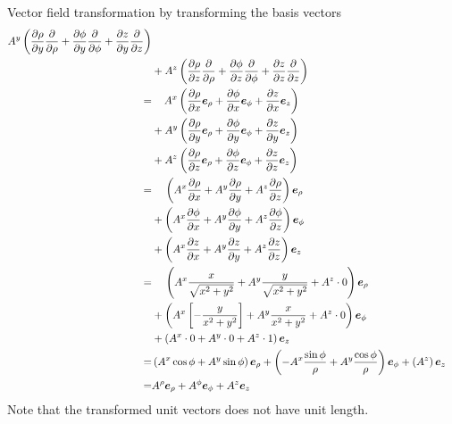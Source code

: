 \documentclass[a4paper, 12pt]{article}
\begin{document}
\begin{example}{Vector field transformation by transforming the basis vectors}
\begin{align*}
        A^y\left(
            \frac{\partial {\rho}}{\partial{y}}\frac{\partial {}}{\partial{\rho}} +
            \frac{\partial {\phi}}{\partial{y}}\frac{\partial {}}{\partial{\phi}} +
            \frac{\partial {z}}{\partial{y}}\frac{\partial {}}{\partial{z}}
           \right)\\
      &+
        A^z\left(
            \frac{\partial {\rho}}{\partial{z}}\frac{\partial {}}{\partial{\rho}} +
            \frac{\partial {\phi}}{\partial{z}}\frac{\partial {}}{\partial{\phi}} +
            \frac{\partial {z}}{\partial{z}}\frac{\partial {}}{\partial{z}}
           \right)\\
     =& \quad\, A^x\left(
            \frac{\partial {\rho}}{\partial{x}}\boldsymbol{e}_{\rho} +
            \frac{\partial {\phi}}{\partial{x}}\boldsymbol{e}_{\phi} +
            \frac{\partial {z}}{\partial{x}}\boldsymbol{e}_{z}
           \right)\\
      &+
        A^y\left(
            \frac{\partial {\rho}}{\partial{y}}\boldsymbol{e}_{\rho} +
            \frac{\partial {\phi}}{\partial{y}}\boldsymbol{e}_{\phi} +
            \frac{\partial {z}}{\partial{y}}\boldsymbol{e}_{z}
           \right)\\
      &+
        A^z\left(
            \frac{\partial {\rho}}{\partial{z}}\boldsymbol{e}_{\rho} +
            \frac{\partial {\phi}}{\partial{z}}\boldsymbol{e}_{\phi} +
            \frac{\partial {z}}{\partial{z}}\boldsymbol{e}_{z}
           \right)\\
     =& \quad\, \left(
            A^x\frac{\partial {\rho}}{\partial{x}} +
            A^y\frac{\partial {\rho}}{\partial{y}} +
            A^z\frac{\partial {\rho}}{\partial{z}}
                 \right)\boldsymbol{e}_{\rho}\\
      &+
        \left(
            A^x\frac{\partial {\phi}}{\partial{x}} +
            A^y\frac{\partial {\phi}}{\partial{y}} +
            A^z\frac{\partial {\phi}}{\partial{z}}
        \right)\boldsymbol{e}_{\phi}\\
      &+
        \left(
            A^x\frac{\partial {z}}{\partial{x}} +
            A^y\frac{\partial {z}}{\partial{y}} +
            A^z\frac{\partial {z}}{\partial{z}}
        \right)\boldsymbol{e}_{z}\\
     =& \quad\, \left(
            A^x\frac{x}{\sqrt{x^2+y^2}} +
            A^y\frac{y}{\sqrt{x^2+y^2}} +
            A^z\cdot0
                 \right)\boldsymbol{e}_{\rho}\\
      &+
        \left(
            A^x\left[-\frac{y}{x^2+y^2}\right] +
            A^y\frac{x}{x^2+y^2} +
            A^z\cdot0
        \right)\boldsymbol{e}_{\phi}\\
      &+
        \left(
            A^x\cdot0 +
            A^y\cdot0 +
            A^z\cdot1
        \right)\boldsymbol{e}_{z}\\
     =& \left(
            A^x\cos\phi +
            A^y\sin\phi
        \right)\boldsymbol{e}_{\rho}
      +
        \left(
            -A^x\frac{\sin\phi}{\rho} +
            A^y\frac{\cos\phi}{\rho}
        \right)\boldsymbol{e}_{\phi}
      +
        \left(A^z\right)\boldsymbol{e}_{z}\\
     =& A^{\rho}\boldsymbol{e}_{\rho} + A^{\phi}\boldsymbol{e}_{\phi} + A^z\boldsymbol{e}_{z}\\
 \end{align*}
 Note that the transformed unit vectors does not have unit length.


\end{example}
\end{document}
